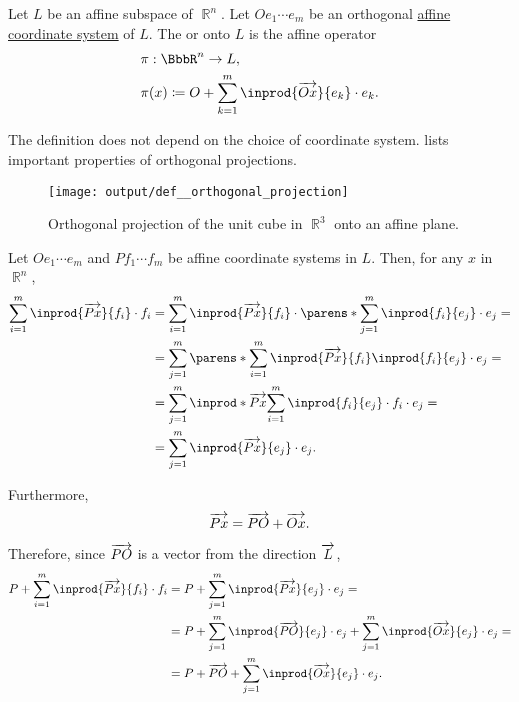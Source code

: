 \begin{definition}\label{def:orthogonal_projection}
  Let \( L \) be an affine subspace of \( \BbbR^n \). Let \( Oe_1 \cdots e_m \) be an orthogonal \hyperref[def:affine_coordinate_system]{affine coordinate system} of \( L \). The  or  onto \( L \) is the affine operator
  \begin{equation*}
    \begin{aligned}
      &\pi: \BbbR^n \to L, \\
      &\pi(x) \coloneqq O + \sum_{k=1}^m \inprod {\vect{Ox}} {e_k} \cdot e_k.
    \end{aligned}
  \end{equation*}

  The definition does not depend on the choice of coordinate system.  lists important properties of orthogonal projections.

  \begin{figure}[!ht]
    \hfill
    \texttt{[image: output/def\_\_orthogonal\_projection]}
    \hfill
    \hfill
    \caption{Orthogonal projection of the unit cube in \( \BbbR^3 \) onto an affine plane.}\label{fig:def:orthogonal_projection}
  \end{figure}
\end{definition}
\begin{defproof}
  Let \( O e_1\cdots e_m \) and \( P f_1 \cdots f_m \) be affine coordinate systems in \( L \). Then, for any \( x \) in \( \BbbR^n \),
  \begin{align*}
    \sum_{i=1}^m \inprod {\vect{Px}} {f_i} \cdot f_i
    &=
    \sum_{i=1}^m \inprod {\vect{Px}} {f_i} \cdot \parens*{ \sum_{j=1}^m \inprod {f_i} {e_j} \cdot e_j }
    = \\ &=
    \sum_{j=1}^m \parens*{ \sum_{i=1}^m \inprod {\vect{Px}} {f_i} \inprod {f_i} {e_j} } \cdot e_j
    = \\ &=
    \sum_{j=1}^m \inprod* {\vect{Px}} {\sum_{i=1}^m \inprod {f_i} {e_j} \cdot f_i} \cdot e_j
    = \\ &=
    \sum_{j=1}^m \inprod {\vect{Px}} {e_j} \cdot e_j.
  \end{align*}

  Furthermore,
  \begin{equation*}
    \overrightarrow{Px} = \overrightarrow{PO} + \overrightarrow{Ox}.
  \end{equation*}

  Therefore, since \( \overrightarrow{PO} \) is a vector from the direction \( \overrightarrow{L} \),
  \begin{align*}
    P + \sum_{i=1}^m \inprod {\vect{Px}} {f_i} \cdot f_i
    &=
    P + \sum_{j=1}^m \inprod {\vect{Px}} {e_j} \cdot e_j
    = \\ &=
    P + \sum_{j=1}^m \inprod {\vect{PO}} {e_j} \cdot e_j + \sum_{j=1}^m \inprod {\vect{Ox}} {e_j} \cdot e_j
    = \\ &=
    P + \vect{PO} + \sum_{j=1}^m \inprod {\vect{Ox}} {e_j} \cdot e_j.
  \end{align*}
\end{defproof}

